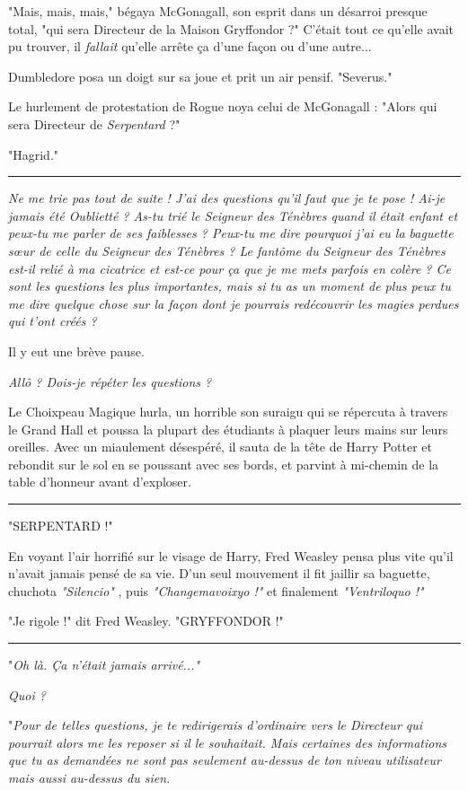 "Mais, mais, mais," bégaya McGonagall, son esprit dans un désarroi presque total, "qui sera Directeur de la Maison Gryffondor ?" C'était tout ce qu'elle avait pu trouver, il \emph{fallait}  qu'elle arrête ça d'une façon ou d'une autre...

Dumbledore posa un doigt sur sa joue et prit un air pensif. "Severus."

Le hurlement de protestation de Rogue noya celui de McGonagall : "Alors qui sera Directeur de \emph{Serpentard}  ?"

"Hagrid."
\par\noindent\rule{\textwidth}{0.4pt}
\emph{Ne me trie pas tout de suite ! J'ai des questions qu'il faut que je te pose ! Ai-je jamais été Oublietté ? As-tu trié le Seigneur des Ténèbres quand il était enfant et peux-tu me parler de ses faiblesses ? Peux-tu me dire pourquoi j'ai eu la baguette sœur de celle du Seigneur des Ténèbres ? Le fantôme du Seigneur des Ténèbres est-il relié à ma cicatrice et est-ce pour ça que je me mets parfois en colère ? Ce sont les questions les plus importantes, mais si tu as un moment de plus peux tu me dire quelque chose sur la façon dont je pourrais redécouvrir les magies perdues qui t'ont créés ?} 

Il y eut une brève pause.

\emph{Allô ? Dois-je répéter les questions ?} 

Le Choixpeau Magique hurla, un horrible son suraigu qui se répercuta à travers le Grand Hall et poussa la plupart des étudiants à plaquer leurs mains sur leurs oreilles. Avec un miaulement désespéré, il sauta de la tête de Harry Potter et rebondit sur le sol en se poussant avec ses bords, et parvint à mi-chemin de la table d'honneur avant d'exploser.
\par\noindent\rule{\textwidth}{0.4pt}
"SERPENTARD !"

En voyant l'air horrifié sur le visage de Harry, Fred Weasley pensa plus vite qu'il n'avait jamais pensé de sa vie. D'un seul mouvement il fit jaillir sa baguette, chuchota \emph{"Silencio"} , puis \emph{"Changemavoixyo !"}  et finalement \emph{"Ventriloquo !"} 

"Je rigole !" dit Fred Weasley. "GRYFFONDOR !"
\par\noindent\rule{\textwidth}{0.4pt}
"\emph{Oh là. Ça n'était jamais arrivé..."} 

\emph{Quoi ?} 

"\emph{Pour de telles questions, je te redirigerais d'ordinaire vers le Directeur qui pourrait alors me les reposer si il le souhaitait. Mais certaines des informations que tu as demandées ne sont pas seulement au-dessus de ton niveau utilisateur mais aussi au-dessus du sien.} 

